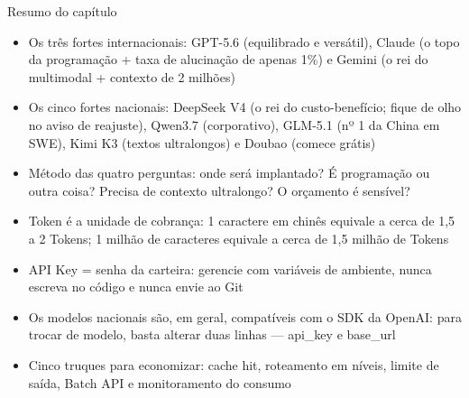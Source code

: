 \begin{tcbsummary}{Resumo do capítulo}
\begin{itemize}
  \item Os três fortes internacionais: GPT-5.6 (equilibrado e versátil), Claude (o topo da programação + taxa de alucinação de apenas 1\%) e Gemini (o rei do multimodal + contexto de 2 milhões)
  \item Os cinco fortes nacionais: DeepSeek V4 (o rei do custo-benefício; fique de olho no aviso de reajuste), Qwen3.7 (corporativo), GLM-5.1 (nº 1 da China em SWE), Kimi K3 (textos ultralongos) e Doubao (comece grátis)
  \item Método das quatro perguntas: onde será implantado? É programação ou outra coisa? Precisa de contexto ultralongo? O orçamento é sensível?
  \item Token é a unidade de cobrança: 1 caractere em chinês equivale a cerca de 1,5 a 2 Tokens; 1 milhão de caracteres equivale a cerca de 1,5 milhão de Tokens
  \item API Key = senha da carteira: gerencie com variáveis de ambiente, nunca escreva no código e nunca envie ao Git
  \item Os modelos nacionais são, em geral, compatíveis com o SDK da OpenAI: para trocar de modelo, basta alterar duas linhas — api\_key e base\_url
  \item Cinco truques para economizar: cache hit, roteamento em níveis, limite de saída, Batch API e monitoramento do consumo
\end{itemize}

\end{tcbsummary}
